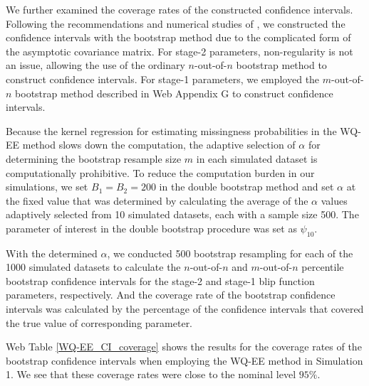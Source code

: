 \documentclass[12pt]{article}
\begin{document}
We further examined the coverage rates of the constructed confidence intervals. Following the recommendations and numerical studies of  \cite{Shao_Wang_2016}, we constructed the confidence intervals with the bootstrap method due to the complicated form of the asymptotic covariance matrix. For stage-2  parameters, non-regularity is not an issue, allowing the use of the ordinary $n$-out-of-$n$ bootstrap method to construct confidence intervals. For stage-1 parameters, we employed the $m$-out-of-$n$ bootstrap method described in Web Appendix G to construct confidence intervals.  %


Because the kernel regression for estimating missingness probabilities in the WQ-EE method slows down the computation, the adaptive selection of $\alpha$ for determining the bootstrap resample size $m$ in each simulated dataset is computationally prohibitive. To reduce the computation burden in our simulations, we set $B_1 = B_2=200$ in the double bootstrap method and set $\alpha$ at the fixed value that was determined by calculating the average of the $\alpha$ values adaptively selected from 10 simulated datasets, each with a sample size 500. The parameter of interest in the double bootstrap procedure was set as $\psi_{10}$. 

With the determined $\alpha$, we conducted 500 bootstrap resampling for each of the 1000 simulated datasets to calculate the $n$-out-of-$n$ and $m$-out-of-$n$ percentile bootstrap confidence intervals for the stage-2 and stage-1 blip function parameters, respectively. And the coverage rate of the bootstrap confidence intervals was calculated by the percentage of the confidence intervals that covered the true value of corresponding parameter.

Web Table \ref{WQ-EE_CI_coverage} shows the results for the coverage rates of the bootstrap confidence intervals when employing the WQ-EE method in Simulation 1. We see that these coverage rates were close to the nominal level $95\%$. 
\end{document}
